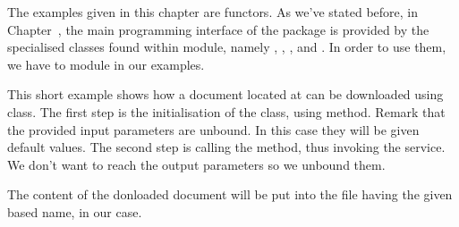 \documentclass{ozdoc}
\begin{document}
\label{CHAPTER.EXAMPLES}



The examples given in this chapter are functors. As we've stated before, in Chapter~, the main programming interface of the  package is provided by the specialised classes found within  module, namely , , ,  and . In order to use them, we have to   module in our examples.  \mozartEMPTY





This short example shows how a document located at  can be downloaded using  class. The first step is the initialisation of the class, using  method. Remark that the provided input parameters are unbound. In this case they will be given default values. The second step is calling the  method, thus invoking the service. We don't want to reach the output parameters so we unbound them.

The content of the donloaded document will be put into the file having the given  based name,  in our case. \mozartEMPTY
 \mozartEMPTY
 

\end{document}
